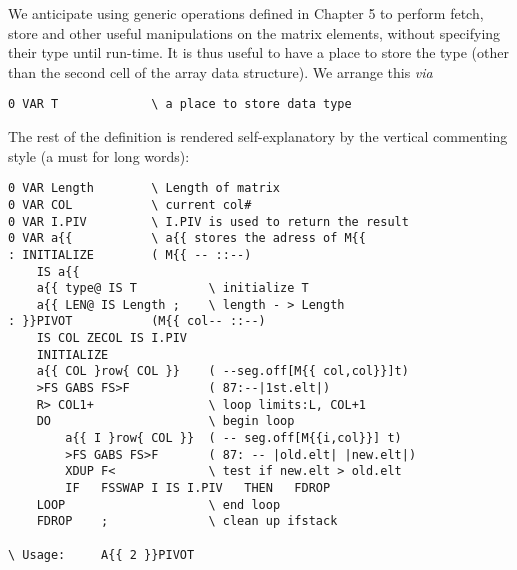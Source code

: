 We anticipate using generic operations  defined in Chapter 5 
to perform fetch, store and other useful manipulations on the
matrix elements, without specifying their type until run-time.
It is thus useful to have a place to store the type (other than the
second cell of the array data structure). We arrange this \textit{via}
\begin{verbatim}
0 VAR T             \ a place to store data type
\end{verbatim}
The rest of the definition is rendered self-explanatory by the 
vertical commenting style (a must for long words):
\begin{verbatim}
0 VAR Length        \ Length of matrix
0 VAR COL           \ current col#
0 VAR I.PIV         \ I.PIV is used to return the result
0 VAR a{{           \ a{{ stores the adress of M{{
: INITIALIZE        ( M{{ -- ::--)
    IS a{{
    a{{ type@ IS T          \ initialize T
    a{{ LEN@ IS Length ;    \ length - > Length
: }}PIVOT           (M{{ col-- ::--)
    IS COL ZECOL IS I.PIV
    INITIALIZE
    a{{ COL }row{ COL }}    ( --seg.off[M{{ col,col}}]t)
    >FS GABS FS>F           ( 87:--|1st.elt|)
    R> COL1+                \ loop limits:L, COL+1
    DO                      \ begin loop
        a{{ I }row{ COL }}  ( -- seg.off[M{{i,col}}] t)
        >FS GABS FS>F       ( 87: -- |old.elt| |new.elt|)
        XDUP F<             \ test if new.elt > old.elt
        IF   FSSWAP I IS I.PIV   THEN   FDROP
    LOOP                    \ end loop
    FDROP    ;              \ clean up ifstack

\ Usage:     A{{ 2 }}PIVOT
\end{verbatim}
